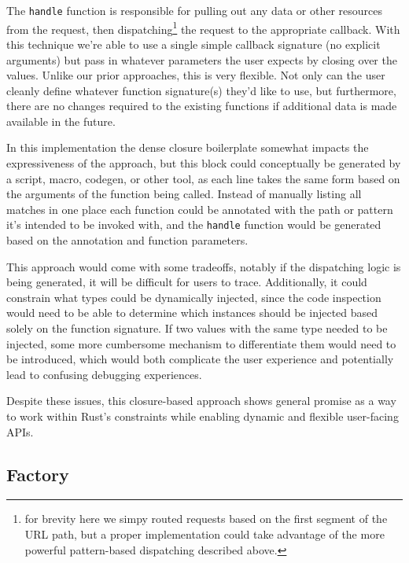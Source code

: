 \documentclass[sigconf]{acmart}
\def\code#1{\lstinline{#1}}
\begin{document}
\begin{minipage}{\linewidth}

\end{minipage}

The \code{handle} function is responsible for pulling out any data or other resources from the request, then dispatching\footnote{for brevity here we simpy routed requests based on the first segment of the URL path, but a proper implementation could take advantage of the more powerful pattern-based dispatching described above.} the request to the appropriate callback. With this technique we're able to use a single simple callback signature (no explicit arguments) but pass in whatever parameters the user expects by closing over the values. Unlike our prior approaches, this is very flexible. Not only can the user cleanly define whatever function signature(s) they'd like to use, but furthermore, there are no changes required to the existing functions if additional data is made available in the future.

In this implementation the dense closure boilerplate somewhat impacts the expressiveness of the approach, but this block could conceptually be generated by a script, macro, codegen, or other tool, as each line takes the same form based on the arguments of the function being called. Instead of manually listing all matches in one place each function could be annotated with the path or pattern it's intended to be invoked with, and the \code{handle} function would be generated based on the annotation and function parameters.

This approach would come with some tradeoffs, notably if the dispatching logic is being generated, it will be difficult for users to trace. Additionally, it could constrain what types could be dynamically injected, since the code inspection would need to be able to determine which instances should be injected based solely on the function signature. If two values with the same type needed to be injected, some more cumbersome mechanism to differentiate them would need to be introduced, which would both complicate the user experience and potentially lead to confusing debugging experiences.

Despite these issues, this closure-based approach shows general promise as a way to work within Rust's constraints while enabling dynamic and flexible user-facing APIs.

\subsection{Factory} \label{factory}
\end{document}
